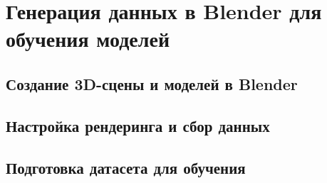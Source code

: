 \chapter{Генерация данных в Blender для обучения моделей}

\section{Создание 3D-сцены и моделей в Blender}
\section{Настройка рендеринга и сбор данных}
\section{Подготовка датасета для обучения}


